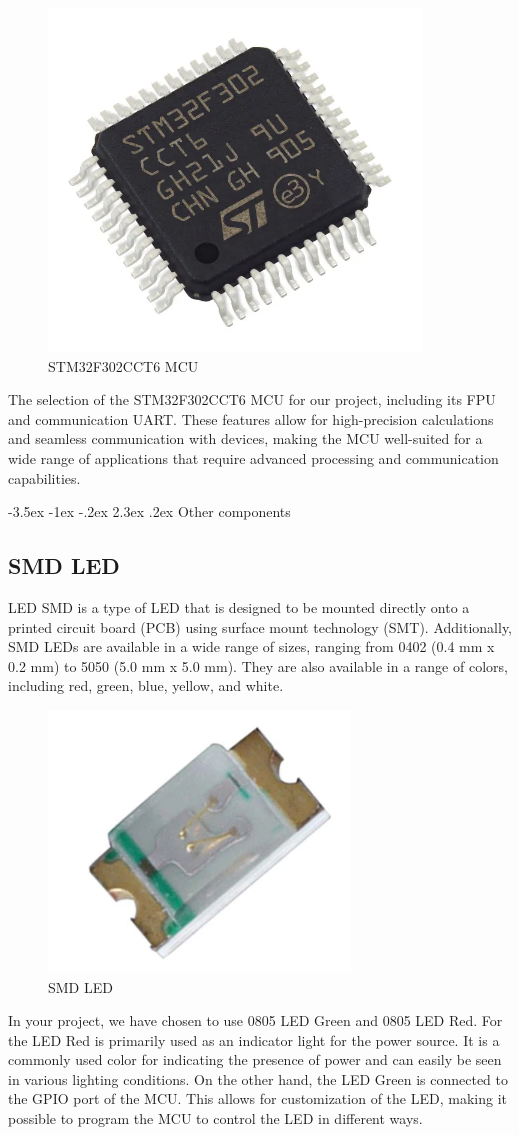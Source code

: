 \documentclass[a4paper, twoside]{report}
\makeatletter
\renewcommand\section{\@startsection {section}{1}{-1em}%
  {-3.5ex \@plus -1ex \@minus -.2ex}%
  {2.3ex \@plus.2ex}%
  {\normalfont\Large\bfseries}}
\makeatother
\begin{document}
\begin{figure}[H]
    \begin{center}
    \includegraphics[width=.25\textwidth]{images/MCU/STM32F302CCT6.png}
    \caption{STM32F302CCT6 MCU}
    \end{center}
\end{figure} 
The selection of the STM32F302CCT6 MCU for our project, including its FPU and communication UART. These features allow for high-precision calculations and seamless communication with devices, making the MCU well-suited for a wide range of applications that require advanced processing and communication capabilities.

\section{Other components}
\subsection{SMD LED}
LED SMD is a type of LED that is designed to be mounted directly onto a printed circuit board (PCB) using surface mount technology (SMT). Additionally, SMD LEDs are available in a wide range of sizes, ranging from 0402 (0.4 mm x 0.2 mm) to 5050 (5.0 mm x 5.0 mm). They are also available in a range of colors, including red, green, blue, yellow, and white.
\begin{figure}[H]
    \begin{center}
    \includegraphics[width=.25\textwidth]{images/LED_Green.png}
    \caption{SMD LED}
    \end{center}
\end{figure} 
In your project, we have chosen to use 0805 LED Green and 0805 LED Red. For the LED Red is primarily used as an indicator light for the power source. It is a commonly used color for indicating the presence of power and can easily be seen in various lighting conditions. On the other hand, the LED Green is connected to the GPIO port of the MCU. This allows for customization of the LED, making it possible to program the MCU to control the LED in different ways.
\end{document}
